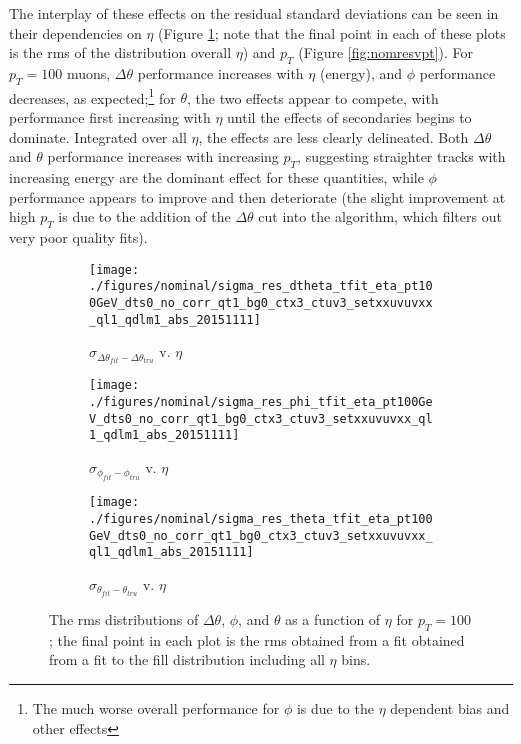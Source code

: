 The interplay of these effects on the residual standard deviations can be seen in their dependencies on  $\eta$ (Figure \ref{fig:nomresveta}; note that the final point in each of these plots is the rms of the distribution overall $\eta$) and $p_T$ (Figure \ref{fig:nomresvpt}).  For $p_T=100$ \GeV muons, $\Delta\theta$ performance increases with $\eta$ (energy), and $\phi$ performance decreases, as expected;\footnote{The much worse overall performance for $\phi$ is due to the $\eta$ dependent bias and other effects} for $\theta$, the two effects appear to compete, with performance first increasing with $\eta$ until the effects of secondaries begins to dominate.  Integrated over all $\eta$, the effects are less clearly delineated.  Both $\Delta\theta$ and $\theta$ performance increases with increasing $p_T$, suggesting straighter tracks with increasing energy are the dominant effect for these quantities, while $\phi$ performance appears to improve and then deteriorate (the slight improvement at high $p_T$ is due to the addition of the $\Delta\theta$ cut into the algorithm, which filters out very poor quality fits).

\begin{figure}[!htbp]\captionsetup{justification=centering}
  \begin{center}
    \begin{subfigure}{0.3\textwidth}\caption{$\sigma_{\Delta\theta_{fit}-\Delta\theta_{tru}}$ v. $\eta$}\texttt{[image: ./figures/nominal/sigma\_res\_dtheta\_tfit\_eta\_pt100GeV\_dts0\_no\_corr\_qt1\_bg0\_ctx3\_ctuv3\_setxxuvuvxx\_ql1\_qdlm1\_abs\_20151111]}\end{subfigure}
    \begin{subfigure}{0.3\textwidth}\caption{$\sigma_{\phi_{fit}-\phi_{tru}}$ v. $\eta$}\texttt{[image: ./figures/nominal/sigma\_res\_phi\_tfit\_eta\_pt100GeV\_dts0\_no\_corr\_qt1\_bg0\_ctx3\_ctuv3\_setxxuvuvxx\_ql1\_qdlm1\_abs\_20151111]}\end{subfigure}
    \begin{subfigure}{0.3\textwidth}\caption{$\sigma_{\theta_{fit}-\theta_{tru}}$ v. $\eta$}\texttt{[image: ./figures/nominal/sigma\_res\_theta\_tfit\_eta\_pt100GeV\_dts0\_no\_corr\_qt1\_bg0\_ctx3\_ctuv3\_setxxuvuvxx\_ql1\_qdlm1\_abs\_20151111]}\end{subfigure}
    \caption{\label{fig:nomresveta} The rms distributions of $\Delta\theta$, $\phi$, and $\theta$ as a function of $\eta$ for $p_T=100$ \GeV; the final point in each plot is the rms obtained from a fit obtained from a fit to the fill distribution including all $\eta$ bins.}
  \end{center}
\end{figure}

